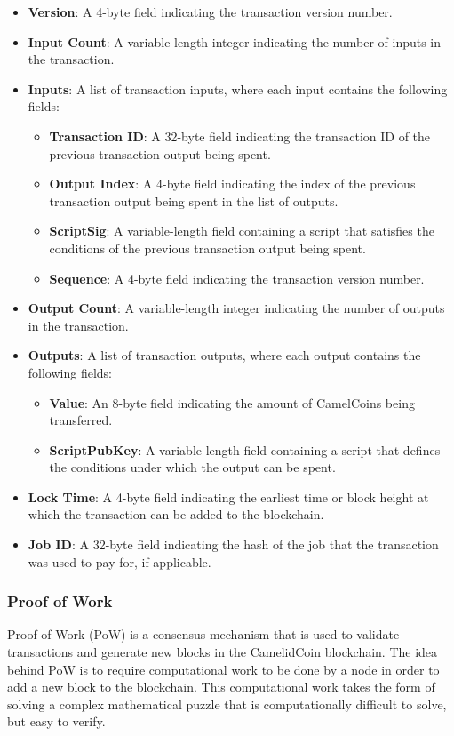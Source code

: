 \documentclass{article}
\begin{document}
\begin{itemize}
    \item \textbf{Version}: A 4-byte field indicating the transaction version number.
    \item \textbf{Input Count}: A variable-length integer indicating the number of inputs in the transaction.
    \item \textbf{Inputs}: A list of transaction inputs, where each input contains the following fields:
    \begin{itemize}
        \item \textbf{Transaction ID}: A 32-byte field indicating the transaction ID of the previous transaction output being spent.
        \item \textbf{Output Index}: A 4-byte field indicating the index of the previous transaction output being spent in the list of outputs.
        \item \textbf{ScriptSig}: A variable-length field containing a script that satisfies the conditions of the previous transaction output being spent.
        \item \textbf{Sequence}: A 4-byte field indicating the transaction version number.
    \end{itemize}
    \item \textbf{Output Count}: A variable-length integer indicating the number of outputs in the transaction.
    \item \textbf{Outputs}: A list of transaction outputs, where each output contains the following fields:
    \begin{itemize}
        \item \textbf{Value}: An 8-byte field indicating the amount of CamelCoins being transferred.
        \item \textbf{ScriptPubKey}: A variable-length field containing a script that defines the conditions under which the output can be spent.
    \end{itemize}
    \item \textbf{Lock Time}: A 4-byte field indicating the earliest time or block height at which the transaction can be added to the blockchain.
    \item \textbf{Job ID}: A 32-byte field indicating the hash of the job that the transaction was used to pay for, if applicable.
\end{itemize}

\subsubsection{Proof of Work}
Proof of Work (PoW) is a consensus mechanism that is used to validate transactions and generate new blocks in the CamelidCoin blockchain. 
The idea behind PoW is to require computational work to be done by a node in order to add a new block to the blockchain. 
This computational work takes the form of solving a complex mathematical puzzle that is computationally difficult to solve, but easy to verify.
\end{document}

